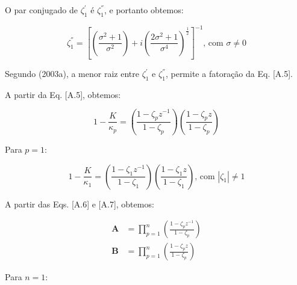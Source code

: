 O par conjugado de $\zeta_{1}^{'}$ é $\zeta_{1}^{''}$, e portanto obtemos: 

\begin{equation}
\label{apIV_eq:20}
\zeta_{1}^{''} = \left[ \left(\frac{\sigma^{2} + 1}{\sigma^{2}}\right) + i \left( \frac{2\sigma^{2} + 1}{\sigma^{4}} \right)^\frac{1}{2} \right]^{-1} \text{, com $\sigma \neq 0$}
\end{equation}

Segundo  (2003a), a menor raiz entre $\zeta^{'}_{1}$ e $\zeta^{''}_{1}$, permite a fatoração da Eq. [A.5].

A partir da Eq. [A.5], obtemos:

\begin{equation}
\label{apIV_eq:21}
1 - \frac{K}{\kappa_{p}} = \left( \frac{1 - \zeta_{p}z^{-1}}{1 - \zeta_{p}} \right)\left( \frac{1 - \zeta_{p}z}{1 - \zeta_{p}} \right)
\end{equation}

Para $p = 1$:

\begin{equation}
\label{apIV_eq:22}
1 - \frac{K}{\kappa_{1}} = \left( \frac{1 - \zeta_{1}z^{-1}}{1 - \zeta_{1}} \right)\left( \frac{1 - \zeta_{1}z}{1 - \zeta_{1}} \right) \text{, com $|\zeta_{1}| \neq 1$}
\end{equation}

A partir das Eqs. [A.6] e [A.7], obtemos:



\begin{align}
\label{apIV_eq:23}
\mathbf{A} & = \prod_{p=1}^{n}{\left( \frac{1 - \zeta_{p}z^{-1}}{1 - \zeta_{p}} \right)} \\
\mathbf{B} & = \prod_{p=1}^{n}{\left( \frac{1 - \zeta_{p}z}{1 - \zeta_{p}} \right)}
\end{align}

Para $n = 1$:


